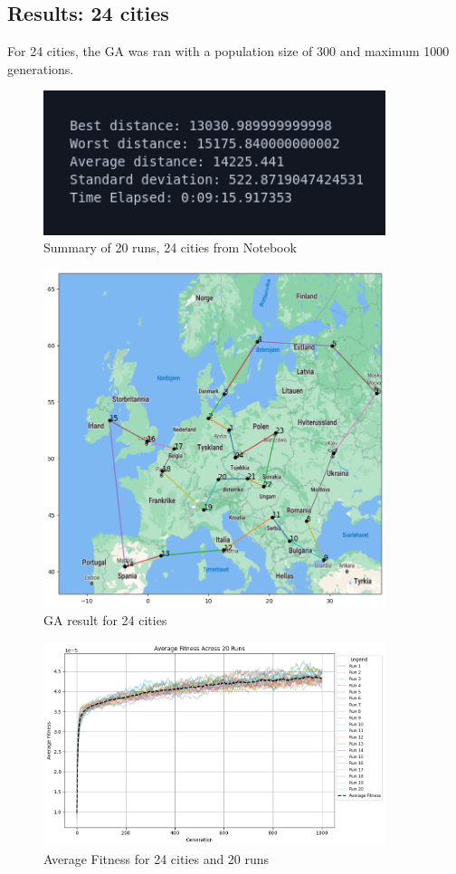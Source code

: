 \documentclass{article}
\begin{document}
    \newpage


    \subsection{Results: 24 cities}

    For 24 cities, the GA was ran with a population size of 300 and maximum 1000 generations.

    \begin{figure}[ht!]
        \includegraphics[width=10cm]{images/ga_24_cities_summary.png}
        \centering
        \caption{Summary of 20 runs, 24 cities from Notebook}
    \end{figure}

    \begin{figure}[ht!]
        \includegraphics[width=10cm]{images/ga_24_cities.png}
        \centering
        \caption{GA result for 24 cities}
    \end{figure}

    \begin{figure}[ht!]
        \includegraphics[width=10cm]{images/ga_24_cities_avg_graph.png}
        \centering
        \caption{Average Fitness for 24 cities and 20 runs}
    \end{figure}
\end{document}
